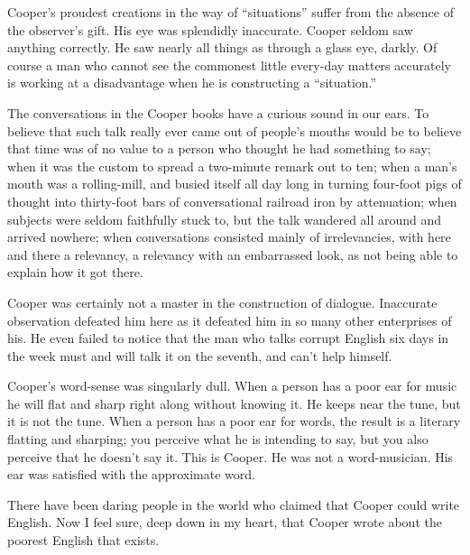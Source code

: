 \documentclass{novelette}
\begin{document}
Cooper's proudest creations in the way of “situations” suffer
from the absence of the observer's gift. His eye was
splendidly inaccurate. Cooper seldom saw anything correctly. He saw
nearly all things as through a glass eye, darkly. Of course a man who
cannot see the commonest little every-day matters accurately is
working at a disadvantage when he is constructing a “situation.”

The conversations in the Cooper books have a curious sound in our
ears. To believe that such talk really ever came out of people's mouths
would be to believe that time was of no value to
a person who thought he had something to say; when it was the custom
to spread a two-minute remark out to ten; when a man's mouth was a
rolling-mill, and busied itself all day long in turning four-foot pigs
of thought into thirty-foot bars of conversational railroad iron by
attenuation; when subjects were seldom faithfully stuck to, but the talk
wandered all around and arrived nowhere; when conversations consisted
mainly of irrelevancies, with here and there a relevancy, a relevancy
with an embarrassed look, as not being able to explain how it got there.

Cooper was certainly not a master in the construction of dialogue.
Inaccurate observation defeated him here as it defeated him in so many
other enterprises of his. He even failed to notice that the man who
talks corrupt English six days in the week must and will talk it on
the seventh, and can't help himself.


Cooper's word-sense was singularly dull. When a person has a poor ear
for music he will flat and sharp right along without knowing it. He
keeps near the tune, but it is not the tune. When a person has a poor
ear for words, the result is a literary flatting and sharping; you
perceive what he is intending to say, but you also perceive that he
doesn't say it. This is Cooper. He was not a word-musician. His ear was
satisfied with the approximate word.


There have been daring people in the world who claimed that Cooper could
write English. Now I feel sure, deep down in my heart,
that Cooper wrote about the poorest English that exists.



\begin{opening}
\null\null\null\null\null\null
{}
\null
{}
\null\null\null\null\null
\end{opening}
\end{document}
